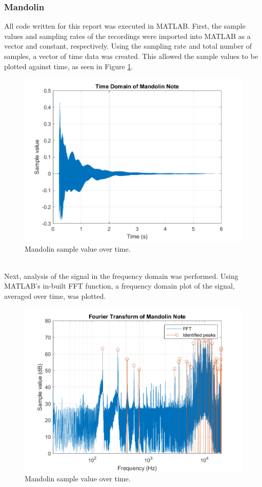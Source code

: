 \documentclass{article}
\begin{document}
        \subsubsection{Mandolin}
            All code written for this report was executed in MATLAB.
            First, the sample values and sampling rates of the recordings were imported into MATLAB as a vector and constant, respectively.
            Using the sampling rate and total number of samples, a vector of time data was created.
            This allowed the sample values to be plotted against time, as seen in Figure \ref{timeDomainMando}.
            \begin{figure}[h]
                \includegraphics[scale=0.5]{images/timeDomainMando.png}%
                \centering
                \caption{Mandolin sample value over time.}
                \label{timeDomainMando}
            \end{figure}
            \\
            Next, analysis of the signal in the frequency domain was performed.
            Using MATLAB's in-built FFT function, a frequency domain plot of the signal, averaged over time, was plotted.
            \begin{figure}[h]
                \includegraphics[scale=0.5]{images/FFTMando.png}%
                \centering
                \caption{Mandolin sample value over time.}
                \label{FFTMando}
            \end{figure}
\end{document}
